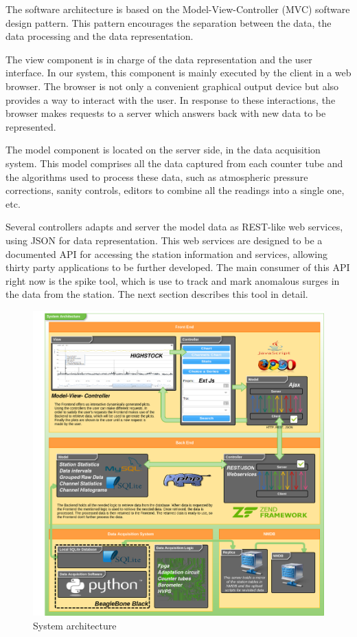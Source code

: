 \documentclass[a4paper]{jpconf}
\begin{document}
The software architecture is based on the Model-View-Controller (MVC) software
design pattern\cite{wiki:MVC}. This pattern encourages the separation between
the data, the data processing and the data representation. 

The view component is in charge of the data representation and the user
interface. In our system, this component is mainly executed by the client in a
web browser. The browser is not only a convenient graphical output device but
also provides a way to interact with the user. In response to these
interactions, the browser makes requests to a server which answers back with new
data to be represented.

The model component is located on the server side, in the data acquisition
system. This model comprises all the data captured from each counter tube and
the algorithms used to process these data, such as atmospheric pressure
corrections, sanity controls, editors to combine all the readings into a single
one, etc.

Several controllers adapts and server the model data as REST-like web services,
using JSON for data representation. This web services are designed to be a
documented API for accessing the station information and services, allowing
thirty party applications to be further developed. The main consumer of this API
right now is the spike tool, which is use to track and mark anomalous surges in
the data from the station. The next section describes this tool in detail.

\begin{figure}[h]
    \centering
    \includegraphics[keepaspectratio, width=1\textwidth]{./resources/Architecture.png}
    \caption{System architecture}
    \label{fig:arch}
\end{figure}
\end{document}

